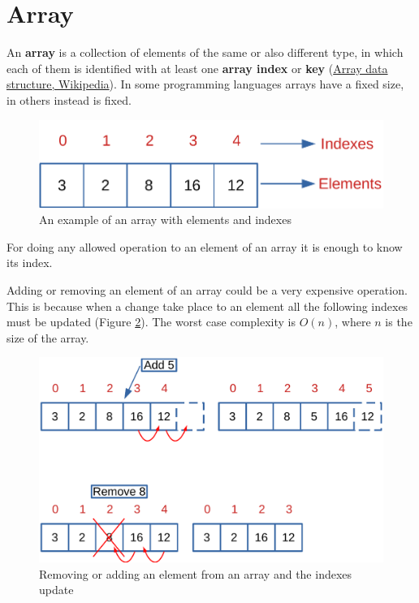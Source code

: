 \section{Array}
An \textbf{array} is a collection of elements of the same or also different type, in which each of them is identified with at least one \textbf{array index} or \textbf{key} \cite{wikiarray} (\href{https://en.wikipedia.org/wiki/Array_data_structure}{Array data structure, Wikipedia}). In some programming languages arrays have a fixed size, in others instead is fixed.
\begin{figure}[H]
	\begin{center}
		\includegraphics[scale=0.6]{chapters/datastructures/images/array_1.pdf}
		\caption[An example of an array with elements and indexes]{An example of an array with elements and indexes}
		\label{array_1}
	\end{center}
\end{figure}

For doing any allowed operation to an element of an array it is enough to know its index. 

Adding or removing an element of an array could be a very expensive operation. This is because when a change take place to an element all the following indexes must be updated (Figure \ref{array_2}). The worst case complexity is \(O(n)\), where \(n\) is the size of the array.
\begin{figure}[H]
	\begin{center}
		\includegraphics[scale=.6]{chapters/datastructures/images/array_2.pdf}
		\caption[Removing or adding an element from an array and the indexes update]{Removing or adding an element from an array and the indexes update}
		\label{array_2}
	\end{center}
\end{figure}

